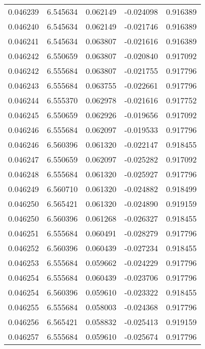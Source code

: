 \begin{tabular}{lrrrr}
0.046239    &  6.545634 &  0.062149 & -0.024098 &             0.916389 \\
0.046240    &  6.545634 &  0.062149 & -0.021746 &             0.916389 \\
0.046241    &  6.545634 &  0.063807 & -0.021616 &             0.916389 \\
0.046242    &  6.550659 &  0.063807 & -0.020840 &             0.917092 \\
0.046242    &  6.555684 &  0.063807 & -0.021755 &             0.917796 \\
0.046243    &  6.555684 &  0.063755 & -0.022661 &             0.917796 \\
0.046244    &  6.555370 &  0.062978 & -0.021616 &             0.917752 \\
0.046245    &  6.550659 &  0.062926 & -0.019656 &             0.917092 \\
0.046246    &  6.555684 &  0.062097 & -0.019533 &             0.917796 \\
0.046246    &  6.560396 &  0.061320 & -0.022147 &             0.918455 \\
0.046247    &  6.550659 &  0.062097 & -0.025282 &             0.917092 \\
0.046248    &  6.555684 &  0.061320 & -0.025927 &             0.917796 \\
0.046249    &  6.560710 &  0.061320 & -0.024882 &             0.918499 \\
0.046250    &  6.565421 &  0.061320 & -0.024890 &             0.919159 \\
0.046250    &  6.560396 &  0.061268 & -0.026327 &             0.918455 \\
0.046251    &  6.555684 &  0.060491 & -0.028279 &             0.917796 \\
0.046252    &  6.560396 &  0.060439 & -0.027234 &             0.918455 \\
0.046253    &  6.555684 &  0.059662 & -0.024229 &             0.917796 \\
0.046254    &  6.555684 &  0.060439 & -0.023706 &             0.917796 \\
0.046254    &  6.560396 &  0.059610 & -0.023322 &             0.918455 \\
0.046255    &  6.555684 &  0.058003 & -0.024368 &             0.917796 \\
0.046256    &  6.565421 &  0.058832 & -0.025413 &             0.919159 \\
0.046257    &  6.555684 &  0.059610 & -0.025674 &             0.917796 \\

\end{tabular}
